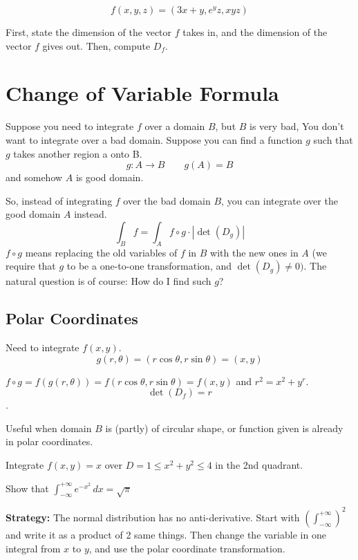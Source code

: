 \begin{exercise}
    $$f(x, y, z) = (3x + y, e^yz, xyz)$$

    First, state the dimension of the vector $f$ takes in, and the dimension of the vector $f$ gives out. Then, compute $D_f$.
\end{exercise}

\section{Change of Variable Formula}

Suppose you need to integrate $f$ over a domain $B$, but $B$ is very bad, You don't want to integrate over a bad domain. Suppose you can find a function $g$ such that $g$ takes another region a onto B. $$g: A \to B \qquad g(A) = B$$ and somehow $A$ is good domain. 

So, instead of integrating $f$ over the bad domain $B$, you can integrate over the good domain $A$ instead. $$\int_B f = \int_A f \circ g \cdot \left| \det(D_g) \right|$$ $f \circ g$ means replacing the old variables of $f$ in $B$ with the new ones in $A$ (we require that $g$ to be a one-to-one transformation, and $\det(D_g) \neq 0)$. The natural question is of course: How do I find such $g$?

\subsection*{Polar Coordinates}

Need to integrate $f(x, y)$. 
$$g(r,\theta) = (r\cos{\theta},r\sin{\theta}) = (x,y)$$

$f \circ g = f(g(r, \theta)) = f(r\cos{\theta}, r\sin{\theta}) = f(x, y)$ and $r^2 = x^2 + y^r$. 
$$\det(D_f) = r$$. 

Useful when domain $B$ is (partly) of circular shape, or function given is already in polar coordinates.

\begin{exercise}
    Integrate $f(x,y) = x$ over $D = {1 \le x^2 + y^2 \le 4}$ in the 2nd quadrant.
\end{exercise}

\begin{exercise}
    Show that $\int_{-\infty}^{+\infty} e^{-x^2} \,dx = \sqrt{\pi}$

    \textbf{Strategy: } The normal distribution has no anti-derivative. Start with $\left( \int_{-\infty}^{+\infty} \right)^2$ and write it as a product of 2 same things. Then change the variable in one integral from $x$ to $y$, and use the polar coordinate transformation.
\end{exercise}